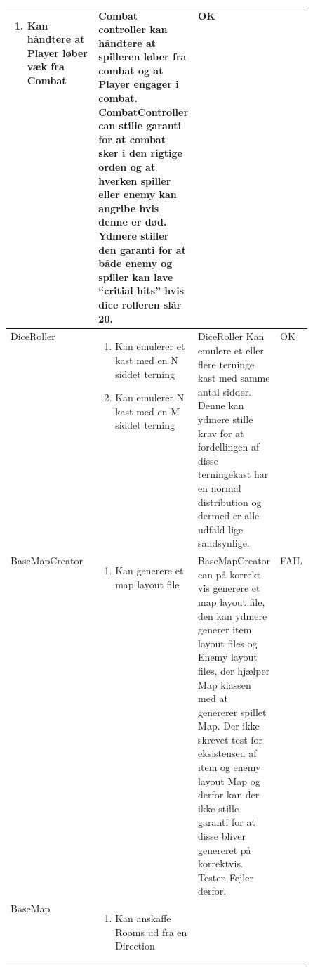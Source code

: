 \begin{center}
\begin{longtable}{|l|p{0.25\linewidth}|p{0.25\linewidth}|l|}
\begin{enumerate}
    \item \begin{flushleft} Kan håndtere at Player løber væk fra Combat \end{flushleft}
  \end{enumerate}
  &
  \flushleft
  Combat controller kan håndtere at spilleren løber fra combat og at Player engager i combat.
  CombatController can stille garanti for at combat sker i den rigtige orden og at hverken
  spiller eller enemy kan angribe hvis denne er død.
  Ydmere stiller den garanti for at både enemy og spiller kan lave ``critial hits'' hvis dice
  rolleren slår 20.
  &
  OK
  \\ \hline
  DiceRoller
  &
  \begin{enumerate}
    \item \begin{flushleft} Kan emulerer et kast med en N siddet terning \end{flushleft}
    \item \begin{flushleft} Kan emulerer N kast med en M siddet terning \end{flushleft}
  \end{enumerate}
  &
  \flushleft
  DiceRoller Kan emulere et eller flere terninge kast med samme antal sidder. Denne kan
  ydmere stille krav for at fordellingen af disse terningekast har en normal distribution 
  og dermed er alle udfald lige sandsynlige.
  &
  OK
  \\ \hline
  BaseMapCreator
  &
  \begin{enumerate}
    \item \begin{flushleft} Kan generere et map layout file \end{flushleft}
  \end{enumerate}
  &
  \flushleft
  BaseMapCreator can på korrekt vis generere et map layout file, den kan ydmere
  generer item layout files og Enemy layout files, der hjælper Map klassen med 
  at genererer spillet Map. Der ikke skrevet test for eksistensen af item og enemy 
  layout Map og derfor kan der ikke stille garanti for at disse bliver genereret 
  på korrektvis. Testen Fejler derfor.
  &
  FAIL
  \\ \hline
  BaseMap
  &
  \begin{enumerate}
    \item \begin{flushleft} Kan anskaffe Rooms ud fra en Direction \end{flushleft}

\end{enumerate}
\end{longtable}
\end{center}
